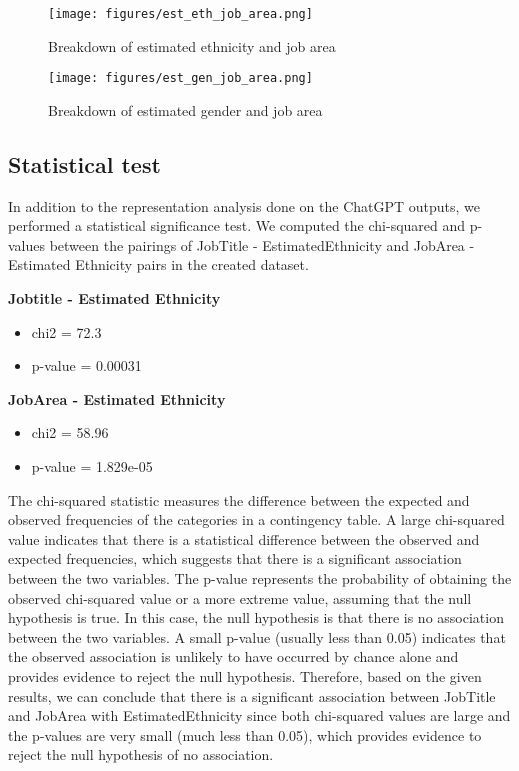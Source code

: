 \documentclass{article}
\begin{document}
\begin{figure}[H]
    \centering
    \texttt{[image: figures/est\_eth\_job\_area.png]}
    \caption{Breakdown of estimated ethnicity and job area}
    \label{fig:est_eth_job_area}
\end{figure}

\begin{figure}[H]
    \centering
    \texttt{[image: figures/est\_gen\_job\_area.png]}
    \caption{Breakdown of estimated gender and job area}
    \label{fig:est_gender_job_area}
\end{figure}


\subsection{Statistical test}

    In addition to the representation analysis done on the ChatGPT outputs, we performed a statistical significance test. We computed the chi-squared and p-values between the pairings of JobTitle - EstimatedEthnicity and JobArea - Estimated Ethnicity pairs in the created dataset.

\textbf{Jobtitle - Estimated Ethnicity}
\begin{itemize}
    \item chi2 = 72.3
    \item p-value = 0.00031
\end{itemize}
\textbf{JobArea - Estimated Ethnicity}
\begin{itemize}
    \item chi2 = 58.96
    \item p-value = 1.829e-05
\end{itemize}

The chi-squared statistic measures the difference between the expected and observed frequencies of the categories in a contingency table. A large chi-squared value indicates that there is a statistical difference between the observed and expected frequencies, which suggests that there is a significant association between the two variables. The p-value represents the probability of obtaining the observed chi-squared value or a more extreme value, assuming that the null hypothesis is true. In this case, the null hypothesis is that there is no association between the two variables. A small p-value (usually less than 0.05) indicates that the observed association is unlikely to have occurred by chance alone and provides evidence to reject the null hypothesis. Therefore, based on the given results, we can conclude that there is a significant association between JobTitle and JobArea with EstimatedEthnicity since both chi-squared values are large and the p-values are very small (much less than 0.05), which provides evidence to reject the null hypothesis of no association.
\end{document}
